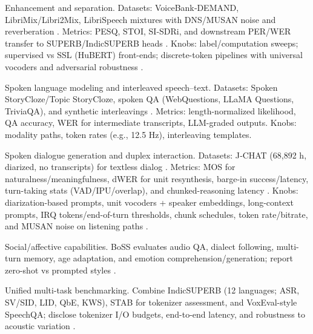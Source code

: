 \documentclass{article}
\begin{document}
Enhancement and separation. Datasets: VoiceBank‑DEMAND, LibriMix/Libri2Mix, LibriSpeech mixtures with DNS/MUSAN noise and reverberation \cite{bai2025dmelspeechtokenizationmadesimple,messica2024nastnoiseawarespeechtokenizationlanguage}. Metrics: PESQ, STOI, SI‑SDRi, and downstream PER/WER transfer to SUPERB/IndicSUPERB heads \cite{entry2025indicsuperbspeechprocessinguniversalperf}. Knobs: label/computation sweeps; supervised vs SSL (HuBERT) front-ends; discrete-token pipelines with universal vocoders and adversarial robustness \cite{chen2023reducingbarriersselfsupervisedlearninghu,mousavi2024howshouldweextractdiscreteaudiotokenssel,djanibekov2025spiritpatchingspeechlanguagemodelsagains}.

Spoken language modeling and interleaved speech–text. Datasets: Spoken StoryCloze/Topic StoryCloze, spoken QA (WebQuestions, LLaMA Questions, TriviaQA), and synthetic interleavings \cite{zeng2024scalingspeechtextpretrainingsyntheticint}. Metrics: length-normalized likelihood, QA accuracy, WER for intermediate transcripts, LLM-graded outputs. Knobs: modality paths, token rates (e.g., 12.5 Hz), interleaving templates.

Spoken dialogue generation and duplex interaction. Datasets: J‑CHAT (68,892 h, diarized, no transcripts) for textless dialog \cite{nakata2024jchatjapaneselargescalespokendialoguecor}. Metrics: MOS for naturalness/meaningfulness, dWER for unit resynthesis, barge-in success/latency, turn-taking stats (VAD/IPU/overlap), and chunked-reasoning latency \cite{chiang2025stitchsimultaneousthinkingtalkingchunked}. Knobs: diarization-based prompts, unit vocoders + speaker embeddings, long-context prompts, IRQ tokens/end-of-turn thresholds, chunk schedules, token rate/bitrate, and MUSAN noise on listening paths \cite{li2025continuousspeechtokenizertext,vashishth2024stabspeechtokenizerassessmentbenchmark}.

Social/affective capabilities. BoSS evaluates audio QA, dialect following, multi-turn memory, age adaptation, and emotion comprehension/generation; report zero-shot vs prompted styles \cite{wang2025bossbeyondsemanticspeech}.

Unified multi-task benchmarking. Combine IndicSUPERB (12 languages; ASR, SV/SID, LID, QbE, KWS), STAB for tokenizer assessment, and VoxEval-style SpeechQA; disclose tokenizer I/O budgets, end-to-end latency, and robustness to acoustic variation \cite{vashishth2024stabspeechtokenizerassessmentbenchmark,cui2025voxevalbenchmarkingknowledgeunderstandin,maimon2025salmonsuiteacousticlanguagemodelevaluati}.
\end{document}
